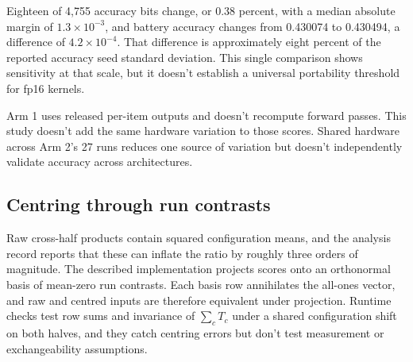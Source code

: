Eighteen of 4,755 accuracy bits change, or 0.38 percent, with a median absolute margin of $1.3\times10^{-3}$, and battery accuracy changes from 0.430074 to 0.430494, a difference of $4.2\times10^{-4}$. That difference is approximately eight percent of the reported accuracy seed standard deviation. This single comparison shows sensitivity at that scale, but it doesn't establish a universal portability threshold for fp16 kernels.

Arm 1 uses released per-item outputs and doesn't recompute forward passes. This study doesn't add the same hardware variation to those scores. Shared hardware across Arm 2's 27 runs reduces one source of variation but doesn't independently validate accuracy across architectures.

\subsection{Centring through run contrasts}
\label{app:centring}
Raw cross-half products contain squared configuration means, and the analysis record reports that these can inflate the ratio by roughly three orders of magnitude. The described implementation projects scores onto an orthonormal basis of mean-zero run contrasts. Each basis row annihilates the all-ones vector, and raw and centred inputs are therefore equivalent under projection. Runtime checks test row sums and invariance of $\sum_c T_c$ under a shared configuration shift on both halves, and they catch centring errors but don't test measurement or exchangeability assumptions.
